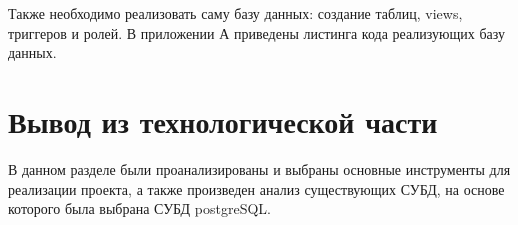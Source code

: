 Также необходимо реализовать саму базу данных: создание таблиц, views, триггеров и ролей. В приложении А приведены листинга кода реализующих базу данных.

\section*{Вывод из технологической части}
В данном разделе были проанализированы и выбраны основные инструменты для реализации проекта, а также произведен анализ существующих СУБД, на основе которого была выбрана СУБД postgreSQL.